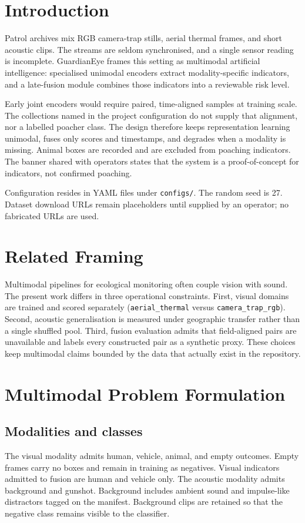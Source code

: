 \documentclass[conference]{IEEEtran}
\begin{document}
\section{Introduction}
Patrol archives mix RGB camera-trap stills, aerial thermal frames, and short acoustic clips. The streams are seldom synchronised, and a single sensor reading is incomplete. GuardianEye frames this setting as multimodal artificial intelligence: specialised unimodal encoders extract modality-specific indicators, and a late-fusion module combines those indicators into a reviewable risk level.

Early joint encoders would require paired, time-aligned samples at training scale. The collections named in the project configuration do not supply that alignment, nor a labelled poacher class. The design therefore keeps representation learning unimodal, fuses only scores and timestamps, and degrades when a modality is missing. Animal boxes are recorded and are excluded from poaching indicators. The banner shared with operators states that the system is a proof-of-concept for indicators, not confirmed poaching.

Configuration resides in YAML files under \texttt{configs/}. The random seed is 27. Dataset download URLs remain placeholders until supplied by an operator; no fabricated URLs are used.

\section{Related Framing}
Multimodal pipelines for ecological monitoring often couple vision with sound. The present work differs in three operational constraints. First, visual domains are trained and scored separately (\texttt{aerial\_thermal} versus \texttt{camera\_trap\_rgb}). Second, acoustic generalisation is measured under geographic transfer rather than a single shuffled pool. Third, fusion evaluation admits that field-aligned pairs are unavailable and labels every constructed pair as a synthetic proxy. These choices keep multimodal claims bounded by the data that actually exist in the repository.

\section{Multimodal Problem Formulation}
\subsection{Modalities and classes}
The visual modality admits human, vehicle, animal, and empty outcomes. Empty frames carry no boxes and remain in training as negatives. Visual indicators admitted to fusion are human and vehicle only. The acoustic modality admits background and gunshot. Background includes ambient sound and impulse-like distractors tagged on the manifest. Background clips are retained so that the negative class remains visible to the classifier.
\end{document}
